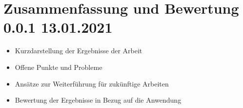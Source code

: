 %

\chapter{Zusammenfassung und Bewertung 0.0.1 13.01.2021}\label{ch:zusammenfassung}
\begin{itemize}
	\item Kurzdarstellung der Ergebnisse der Arbeit
	\item Offene Punkte und Probleme
	\item Ansätze zur Weiterführung für zukünftige Arbeiten
	\item Bewertung der Ergebnisse in Bezug auf die Anwendung
\end{itemize}
